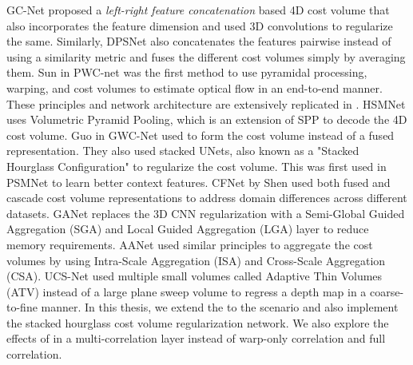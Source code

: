  GC-Net \cite{kendall2017end} proposed a \textit{left-right feature concatenation} based 4D cost volume that also incorporates the feature dimension and used 3D convolutions to regularize the same. Similarly, DPSNet \cite{im2019dpsnet} also concatenates the features pairwise instead of using a similarity metric and fuses the different cost volumes simply by averaging them. Sun {\etal} in PWC-net \cite{sun2018pwc} was the first method to use pyramidal processing, warping, and cost volumes to estimate optical flow in an end-to-end manner. These principles and network architecture are extensively replicated in {\mvs}. HSMNet \cite{yang2019hierarchical} uses Volumetric Pyramid Pooling, which is an extension of SPP to decode the 4D cost volume. Guo {\etal} in GWC-Net\cite{guo2019group} used {\gwc} to form the cost volume instead of a fused representation. They also used stacked UNets, also known as a "Stacked Hourglass Configuration" to regularize the cost volume. This was first used in PSMNet \cite{chang2018pyramid} to learn better context features. CFNet by Shen {\etal} \cite{shen2021cfnet} used both fused and cascade cost volume representations to address domain differences across different datasets. GANet \cite{Zhang2019GANetGA} replaces the 3D CNN regularization with a Semi-Global Guided Aggregation (SGA) and Local Guided Aggregation (LGA) layer to reduce memory requirements. AANet \cite{xu2020aanet} used similar principles to aggregate the cost volumes by using Intra-Scale Aggregation (ISA) and Cross-Scale Aggregation (CSA).  UCS-Net \cite{cheng2020deep} used multiple small volumes called Adaptive Thin Volumes (ATV) instead of a large plane sweep volume to regress a depth map in a coarse-to-fine manner. In this thesis, we extend the {\gwc} to the {\mvs} scenario and also implement the stacked hourglass cost volume regularization network. We also explore the effects of {\gwc} in a multi-correlation layer instead of warp-only correlation and full correlation.
